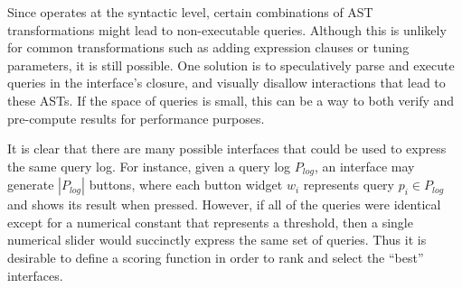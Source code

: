 
  Since \sys operates at the syntactic level, certain combinations of AST transformations might lead to non-executable queries.  Although this is unlikely for common transformations such as adding expression clauses or tuning parameters, it is still possible.  One solution is to speculatively parse and execute queries in the interface's closure, and visually disallow interactions that lead to these ASTs.  If the space of queries is small, this can be a way to both verify and pre-compute results for performance purposes.    %

It is clear that there are many possible interfaces that could be used to express the same query log.  For instance, given a query log $P_{log}$, an interface may generate $|P_{log}|$ buttons, where each button widget $w_i$ represents query $p_i \in P_{log}$ and shows its result when pressed.  However, if all of the queries were identical except for a numerical constant that represents a threshold, then a single numerical slider would succinctly express the same set of queries.   Thus it is desirable to define a scoring function in order to rank and select the ``best'' interfaces.


